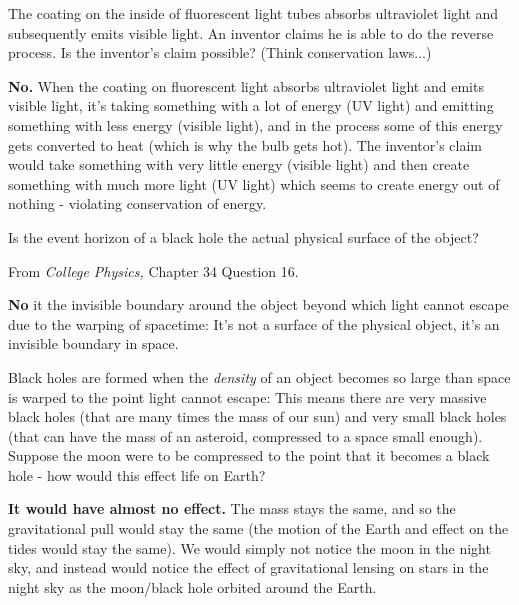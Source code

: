 \documentclass[12pt]{exam}
\begin{document}
\begin{questions}
	
\question The coating on the inside of fluorescent light tubes absorbs ultraviolet light and subsequently emits visible light. An inventor claims he is able to do the reverse process. Is the inventor's claim possible? (Think conservation laws...)
	\begin{TheSolution}
		\textbf{No.} When the coating on fluorescent light absorbs ultraviolet light and emits visible light, it's taking something with a lot of energy (UV light) and emitting something with less energy (visible light), and in the process some of this energy gets converted to heat (which is why the bulb gets hot). The inventor's claim would take something with very little energy (visible light) and then create something with much more light (UV light) which seems to create energy out of nothing - violating conservation of energy.
	\end{TheSolution}

\question Is the event horizon of a black hole the actual physical surface of the object?

From \textit{College Physics,} Chapter 34 Question 16.
\begin{TheSolution}
	\textbf{No} it the invisible boundary around the object beyond which light cannot escape due to the warping of spacetime: It's not a surface of the physical object, it's an invisible boundary in space.
\end{TheSolution}

\question Black holes are formed when the \textit{density} of an object becomes so large than space is warped to the point light cannot escape: This means there are very massive black holes (that are many times the mass of our sun) and very small black holes (that can have the mass of an asteroid, compressed to a space small enough). Suppose the moon were to be compressed to the point that it becomes a black hole - how would this effect life on Earth?
\begin{TheSolution}
	 \textbf{It would have almost no effect.} The mass stays the same, and so the gravitational pull would stay the same (the motion of the Earth and effect on the tides would stay the same). We would simply not notice the moon in the night sky, and instead would notice the effect of gravitational lensing on stars in the night sky as the moon/black hole orbited around the Earth.
\end{TheSolution}


\end{questions}
\end{document}
